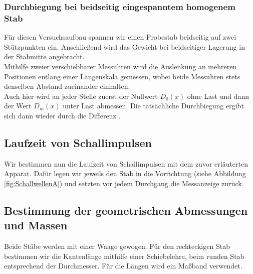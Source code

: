 \subsubsection{Durchbiegung bei beidseitig eingespanntem homogenem Stab}
Für diesen Versuchsaufbau spannen wir einen Probestab beidseitig auf zwei Stützpunkten ein. Anschließend wird das Gewicht bei beidseitiger Lagerung in der Stabmitte angebracht. \\
Mithilfe zweier verschiebbarer Messuhren wird die Auslenkung an mehreren Positionen entlang einer Längenskala gemessen, wobei beide Messuhren stets denselben Abstand zueinander einhalten. \\
Auch hier wird an jeder Stelle zuerst der Nullwert $D_0 (x)$ ohne Last und dann der Wert $D_m (x)$ unter Last abmessen. Die tatsächliche Durchbiegung ergibt sich dann wieder durch die Differenz \cite{v103_anleitung}.\\
\subsection{Laufzeit von Schallimpulsen}
Wir bestimmen nun die Laufzeit von Schallimpulsen mit dem zuvor erläuterten Apparat. Dafür legen wir jeweils den Stab in die Vorrichtung (siehe Abbildung \ref{fig:SchallwellenA}) und setzten vor jedem Durchgang die Messanzeige zurück.\\
\subsection{Bestimmung der geometrischen Abmessungen und Massen}
Beide Stäbe werden mit einer Waage gewogen. Für den rechteckigen Stab bestimmen wir die Kantenlänge mithilfe einer Schiebelehre, beim runden Stab entsprechend der Durchmesser. Für die Längen wird ein Maßband verwendet.\\

